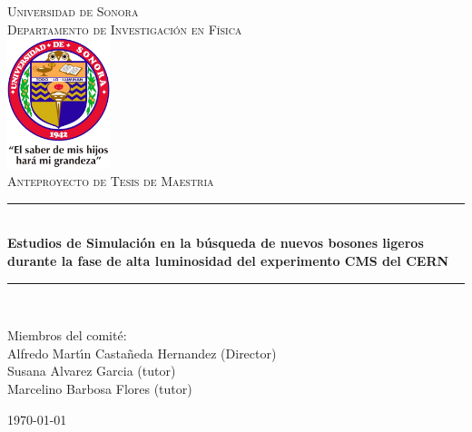 \newcommand{\HRule}{\rule{\linewidth}{0.5mm}} 

\begin{titlepage}
\center
\textsc{
\Huge{Universidad de Sonora}\\[.5cm]
\Large
Departamento de Investigaci\'on en F\'{\i}sica\\[1cm] 
\includegraphics[width=3cm]{unison}\\[3cm]
Anteproyecto de Tesis de Maestria}\\[.7cm] 

\sffamily
\HRule \\[0.4cm]
\textbf{\LARGE Estudios de Simulaci\'on en la b\'usqueda de nuevos bosones ligeros durante la fase de alta luminosidad del experimento CMS del CERN}\\[0.2cm] 
\HRule \\[3cm]
 
\large
\begin{minipage}[t]{.6\textwidth}
\begin{flushleft}
Miembros del comit\'e:
\\
Alfredo Mart\'{\i}n Casta\~neda Hernandez (Director)\\
Susana Alvarez Garcia (tutor)\\
Marcelino Barbosa Flores (tutor)\\
\end{flushleft}

\end{minipage}\hfill




{\today}\\[3cm]

\end{titlepage}


